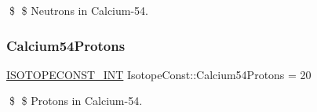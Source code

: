 \$ \$ Neutrons in Calcium-\/54. \mbox{\label{group___isotope_const-_calcium-_ca54_gaacb49cab22ed893cf9f0f1bdd0514388}} 
\subsubsection{\texorpdfstring{Calcium54\+Protons}{Calcium54Protons}}
{\footnotesize\ttfamily \mbox{\hyperlink{group___isotope_const-_macros_ga5f18360b3e99483a35c32d789e62621c}{I\+S\+O\+T\+O\+P\+E\+C\+O\+N\+S\+T\+\_\+\+I\+NT}} Isotope\+Const\+::\+Calcium54\+Protons = 20}

\$ \$ Protons in Calcium-\/54. 